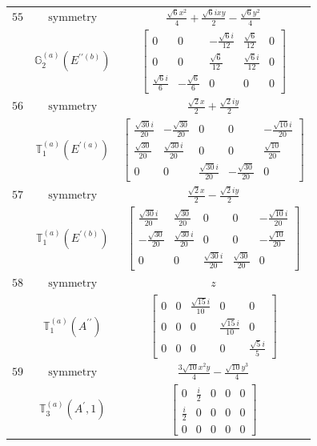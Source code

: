 \documentclass[fleqn,8pt,landscape]{jsarticle}
\begin{document}
\begin{longtable}{ccc}
$ 55 $ & $ \text{symmetry} $ & $ \frac{\sqrt{6} x^{2}}{4} + \frac{\sqrt{6} i x y}{2} - \frac{\sqrt{6} y^{2}}{4} $ \\
$  $ & $ \mathbb{G}_{2}^{(a)}(E^{\prime\prime(b)}) $ & $ \begin{bmatrix} 0 & 0 & - \frac{\sqrt{6} i}{12} & \frac{\sqrt{6}}{12} & 0 \\ 0 & 0 & \frac{\sqrt{6}}{12} & \frac{\sqrt{6} i}{12} & 0 \\ \frac{\sqrt{6} i}{6} & - \frac{\sqrt{6}}{6} & 0 & 0 & 0 \end{bmatrix} $ \\ \hline
$ 56 $ & $ \text{symmetry} $ & $ \frac{\sqrt{2} x}{2} + \frac{\sqrt{2} i y}{2} $ \\
$  $ & $ \mathbb{T}_{1}^{(a)}(E^{\prime(a)}) $ & $ \begin{bmatrix} \frac{\sqrt{30} i}{20} & - \frac{\sqrt{30}}{20} & 0 & 0 & - \frac{\sqrt{10} i}{20} \\ \frac{\sqrt{30}}{20} & \frac{\sqrt{30} i}{20} & 0 & 0 & \frac{\sqrt{10}}{20} \\ 0 & 0 & \frac{\sqrt{30} i}{20} & - \frac{\sqrt{30}}{20} & 0 \end{bmatrix} $ \\ \hline
$ 57 $ & $ \text{symmetry} $ & $ \frac{\sqrt{2} x}{2} - \frac{\sqrt{2} i y}{2} $ \\
$  $ & $ \mathbb{T}_{1}^{(a)}(E^{\prime(b)}) $ & $ \begin{bmatrix} \frac{\sqrt{30} i}{20} & \frac{\sqrt{30}}{20} & 0 & 0 & - \frac{\sqrt{10} i}{20} \\ - \frac{\sqrt{30}}{20} & \frac{\sqrt{30} i}{20} & 0 & 0 & - \frac{\sqrt{10}}{20} \\ 0 & 0 & \frac{\sqrt{30} i}{20} & \frac{\sqrt{30}}{20} & 0 \end{bmatrix} $ \\ \hline
$ 58 $ & $ \text{symmetry} $ & $ z $ \\
$  $ & $ \mathbb{T}_{1}^{(a)}(A^{\prime\prime}) $ & $ \begin{bmatrix} 0 & 0 & \frac{\sqrt{15} i}{10} & 0 & 0 \\ 0 & 0 & 0 & \frac{\sqrt{15} i}{10} & 0 \\ 0 & 0 & 0 & 0 & \frac{\sqrt{5} i}{5} \end{bmatrix} $ \\ \hline
$ 59 $ & $ \text{symmetry} $ & $ \frac{3 \sqrt{10} x^{2} y}{4} - \frac{\sqrt{10} y^{3}}{4} $ \\
$  $ & $ \mathbb{T}_{3}^{(a)}(A^{\prime},1) $ & $ \begin{bmatrix} 0 & \frac{i}{2} & 0 & 0 & 0 \\ \frac{i}{2} & 0 & 0 & 0 & 0 \\ 0 & 0 & 0 & 0 & 0 \end{bmatrix} $ \\ \hline

\end{longtable}
\end{document}
